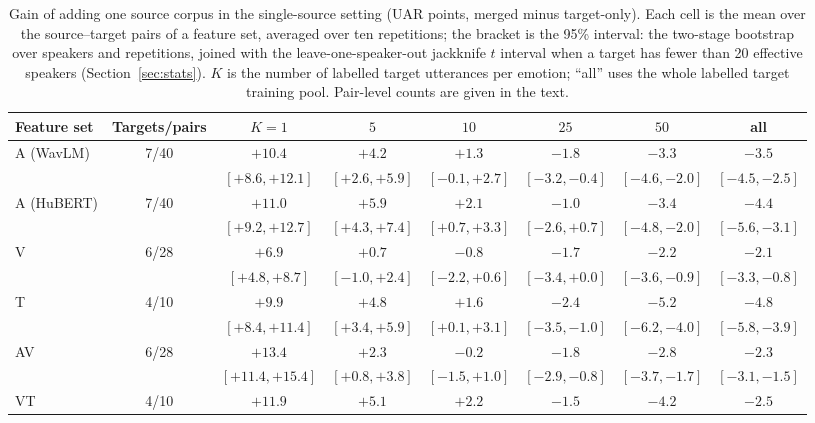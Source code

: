 \begin{table}[t]
\caption{Gain of adding one source corpus in the single-source setting (UAR points, merged minus target-only).
Each cell is the mean over the source--target pairs of a feature set, averaged over ten repetitions;
the bracket is the 95\% interval: the two-stage bootstrap over speakers and repetitions, joined with the leave-one-speaker-out jackknife $t$ interval when a target has fewer than 20 effective speakers (Section~\ref{sec:stats}).
$K$ is the number of labelled target utterances per emotion; ``all'' uses the whole labelled target training pool.
Pair-level counts are given in the text.}
\label{tab:mixing}
\centering
\footnotesize
\setlength{\tabcolsep}{3pt}
\begin{tabular}{@{}lc*{6}{c}@{}}
\toprule
Feature set & Targets/pairs & $K=1$ & $5$ & $10$ & $25$ & $50$ & all \\
\midrule
A (WavLM) & 7/40 & $+10.4$ & $+4.2$ & $+1.3$ & $-1.8$ & $-3.3$ & $-3.5$ \\
 & & \tiny$[+8.6, +12.1]$ & \tiny$[+2.6, +5.9]$ & \tiny$[-0.1, +2.7]$ & \tiny$[-3.2, -0.4]$ & \tiny$[-4.6, -2.0]$ & \tiny$[-4.5, -2.5]$ \\[2pt]
A (HuBERT) & 7/40 & $+11.0$ & $+5.9$ & $+2.1$ & $-1.0$ & $-3.4$ & $-4.4$ \\
 & & \tiny$[+9.2, +12.7]$ & \tiny$[+4.3, +7.4]$ & \tiny$[+0.7, +3.3]$ & \tiny$[-2.6, +0.7]$ & \tiny$[-4.8, -2.0]$ & \tiny$[-5.6, -3.1]$ \\[2pt]
V & 6/28 & $+6.9$ & $+0.7$ & $-0.8$ & $-1.7$ & $-2.2$ & $-2.1$ \\
 & & \tiny$[+4.8, +8.7]$ & \tiny$[-1.0, +2.4]$ & \tiny$[-2.2, +0.6]$ & \tiny$[-3.4, +0.0]$ & \tiny$[-3.6, -0.9]$ & \tiny$[-3.3, -0.8]$ \\[2pt]
T & 4/10 & $+9.9$ & $+4.8$ & $+1.6$ & $-2.4$ & $-5.2$ & $-4.8$ \\
 & & \tiny$[+8.4, +11.4]$ & \tiny$[+3.4, +5.9]$ & \tiny$[+0.1, +3.1]$ & \tiny$[-3.5, -1.0]$ & \tiny$[-6.2, -4.0]$ & \tiny$[-5.8, -3.9]$ \\[2pt]
AV & 6/28 & $+13.4$ & $+2.3$ & $-0.2$ & $-1.8$ & $-2.8$ & $-2.3$ \\
 & & \tiny$[+11.4, +15.4]$ & \tiny$[+0.8, +3.8]$ & \tiny$[-1.5, +1.0]$ & \tiny$[-2.9, -0.8]$ & \tiny$[-3.7, -1.7]$ & \tiny$[-3.1, -1.5]$ \\[2pt]
VT & 4/10 & $+11.9$ & $+5.1$ & $+2.2$ & $-1.5$ & $-4.2$ & $-2.5$ \\

\end{tabular}
\end{table}
